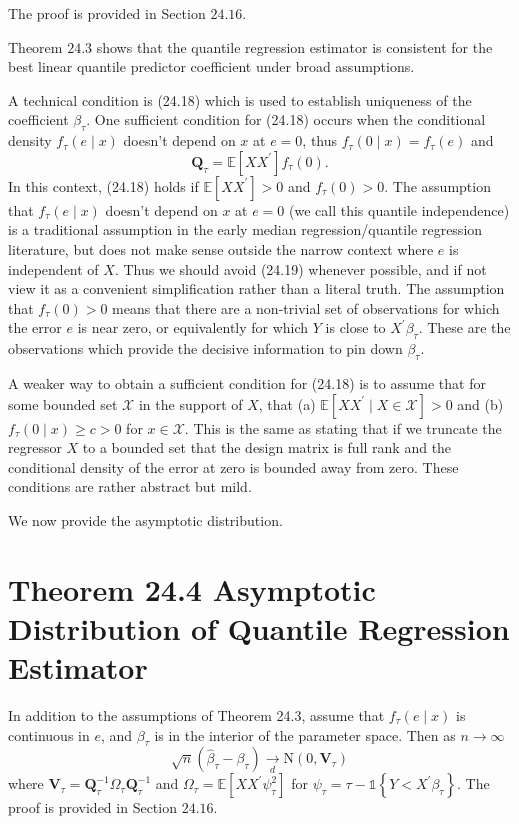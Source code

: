 \documentclass[10pt]{article}
\begin{document}
The proof is provided in Section $24.16$.

Theorem $24.3$ shows that the quantile regression estimator is consistent for the best linear quantile predictor coefficient under broad assumptions.

A technical condition is (24.18) which is used to establish uniqueness of the coefficient $\beta_{\tau}$. One sufficient condition for (24.18) occurs when the conditional density $f_{\tau}(e \mid x)$ doesn't depend on $x$ at $e=0$, thus $f_{\tau}(0 \mid x)=f_{\tau}(e)$ and
$$
\boldsymbol{Q}_{\tau}=\mathbb{E}\left[X X^{\prime}\right] f_{\tau}(0) .
$$
In this context, (24.18) holds if $\mathbb{E}\left[X X^{\prime}\right]>0$ and $f_{\tau}(0)>0$. The assumption that $f_{\tau}(e \mid x)$ doesn't depend on $x$ at $e=0$ (we call this quantile independence) is a traditional assumption in the early median regression/quantile regression literature, but does not make sense outside the narrow context where $e$ is independent of $X$. Thus we should avoid (24.19) whenever possible, and if not view it as a convenient simplification rather than a literal truth. The assumption that $f_{\tau}(0)>0$ means that there are a non-trivial set of observations for which the error $e$ is near zero, or equivalently for which $Y$ is close to $X^{\prime} \beta_{\tau}$. These are the observations which provide the decisive information to pin down $\beta_{\tau}$.

A weaker way to obtain a sufficient condition for (24.18) is to assume that for some bounded set $\mathscr{X}$ in the support of $X$, that (a) $\mathbb{E}\left[X X^{\prime} \mid X \in \mathscr{X}\right]>0$ and (b) $f_{\tau}(0 \mid x) \geq c>0$ for $x \in \mathscr{X}$. This is the same as stating that if we truncate the regressor $X$ to a bounded set that the design matrix is full rank and the conditional density of the error at zero is bounded away from zero. These conditions are rather abstract but mild.

We now provide the asymptotic distribution.

\section{Theorem 24.4 Asymptotic Distribution of Quantile Regression Estimator}
In addition to the assumptions of Theorem 24.3, assume that $f_{\tau}(e \mid x)$ is continuous in $e$, and $\beta_{\tau}$ is in the interior of the parameter space. Then as $n \rightarrow \infty$
$$
\sqrt{n}\left(\widehat{\beta}_{\tau}-\beta_{\tau}\right) \underset{d}{\longrightarrow} \mathrm{N}\left(0, \boldsymbol{V}_{\tau}\right)
$$
where $\boldsymbol{V}_{\tau}=\boldsymbol{Q}_{\tau}^{-1} \Omega_{\tau} \boldsymbol{Q}_{\tau}^{-1}$ and $\Omega_{\tau}=\mathbb{E}\left[X X^{\prime} \psi_{\tau}^{2}\right]$ for $\psi_{\tau}=\tau-\mathbb{1}\left\{Y<X^{\prime} \beta_{\tau}\right\}$. The proof is provided in Section $24.16$.
\end{document}
